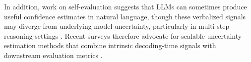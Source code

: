 \documentclass[11pt]{article}
\begin{document}
In addition, work on self-evaluation suggests that LLMs can sometimes produce useful confidence estimates in natural language, though these verbalized signals may diverge from underlying model uncertainty, particularly in multi-step reasoning settings \cite{kadavath2022language, mavi2025selfevaluatingllmsmultisteptasks}. Recent surveys therefore advocate for scalable uncertainty estimation methods that combine intrinsic decoding-time signals with downstream evaluation metrics \cite{kang2025scalable}. 






\end{document}
